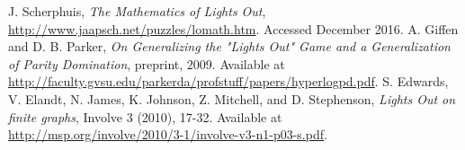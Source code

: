 \documentclass[11pt]{article}
\begin{document}
\clearpage

\begin{thebibliography}{9}
  J. Scherphuis, \textit{The Mathematics of Lights Out},
  \href{http://www.jaapsch.net/puzzles/lomath.htm}{http://www.jaapsch.net/puzzles/lomath.htm}.
  Accessed December 2016.
  A. Giffen and D. B. Parker, \textit{On Generalizing the "Lights Out" Game and a Generalization of Parity Domination}, preprint, 2009. Available at \href{http://faculty.gvsu.edu/parkerda/profstuff/papers/hyperlogpd.pdf}{http://faculty.gvsu.edu/parkerda/profstuff/papers/hyperlogpd.pdf}.
  S. Edwards, V. Elandt, N. James, K. Johnson, Z. Mitchell, and D. Stephenson, \textit{Lights Out on finite graphs}, Involve 3 (2010), 17-32. Available at \href{http://msp.org/involve/2010/3-1/involve-v3-n1-p03-s.pdf}{http://msp.org/involve/2010/3-1/involve-v3-n1-p03-s.pdf}.
\end{thebibliography}
\end{document}
